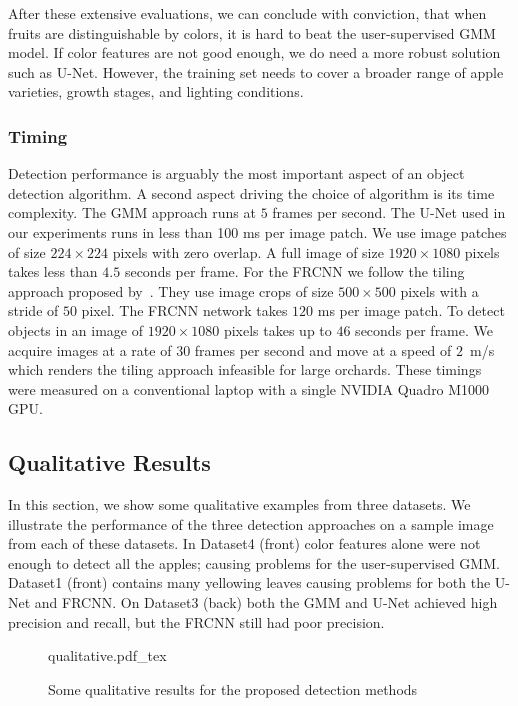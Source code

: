 After these extensive evaluations, we can conclude with conviction, that when fruits are distinguishable by colors, it is hard to beat the user-supervised GMM model. If color features are not good enough, we do need a more robust solution such as U-Net. However, the training set needs to cover a broader range of apple varieties, growth stages, and lighting conditions.

\subsubsection{Timing}
Detection performance is arguably the most important aspect of an object detection algorithm. A second aspect driving the choice of algorithm is its time complexity. The GMM approach runs at $5$ frames per second. The U-Net used in our experiments runs in less than 100 ms per image patch. We use image patches of size $224\times 224$ pixels with zero overlap. A full image of size $1920 \times 1080$ pixels takes less than $4.5$ seconds per frame.  For the FRCNN we follow the tiling approach proposed by~\cite{bargoti_deep_2017}. They use image crops of size $500 \times 500$ pixels with a stride of $50$ pixel. The FRCNN network takes $120$ ms per image patch. To detect objects in an image of $1920 \times 1080$ pixels takes up to $46$ seconds per frame. We acquire images at a rate of $30$ frames per second and move at a speed of $2$~m/s which renders the tiling approach infeasible for large orchards. These timings were measured on a conventional laptop with a single NVIDIA Quadro M1000 GPU.

\subsection{Qualitative Results}
\label{sec:qualitative}
In this section, we show some qualitative examples from three datasets. We illustrate the performance of the three detection approaches on a sample image from each of these datasets. In Dataset4 (front) color features alone were not enough to detect all the apples; causing problems for the user-supervised GMM. Dataset1 (front) contains many yellowing leaves causing problems for both the U-Net and FRCNN. On Dataset3 (back) both the GMM and U-Net achieved high precision and recall, but the FRCNN still had poor precision.

\begin{figure}[hbpt]
    \centering
    \def\svgwidth{0.82\textwidth}
    {qualitative.pdf_tex}
    \caption[Sample qualitative results for the detection methods.]{Some qualitative results for the proposed detection methods}
    \label{fig:qualitative}
\end{figure}


